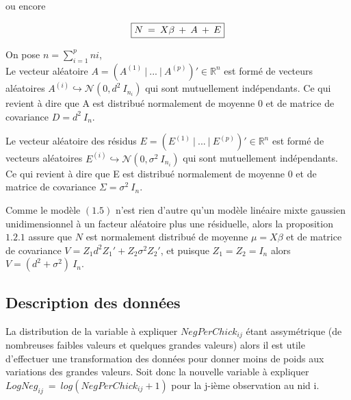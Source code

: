 \documentclass[12pt,fleqn]{book} %
\begin{document}
ou encore

\begin{equation}
\fbox{$
N\:=\:X\beta\:+\:A\:+\:E
$}
\end{equation}

\vspace{1em}

On pose $n=\sum_{i=1}^{p} ni$,\\ 

Le vecteur aléatoire $A=\left(A^{(1)}\:|\:...\:|\:A^{(p)}\right)'\in \mathbb{R}^{n}$ est formé de vecteurs aléatoires $A^{(i)}\hookrightarrow\mathcal{N}(0,d^2\:I_{n_i})$ qui sont mutuellement indépendants. Ce qui revient à dire que A est distribué normalement de moyenne $0$ et de matrice de covariance $D=d^2\:I_n$.  

\vspace{1em}

Le vecteur aléatoire des résidus $E=\left(E^{(1)}\:|\:...\:|\:E^{(p)}\right)'\in \mathbb{R}^{n}$ est formé de vecteurs aléatoires $E^{(i)}\hookrightarrow\mathcal{N}(0,\sigma^2\:I_{n_i})$ qui sont mutuellement indépendants. Ce qui revient à dire que E est distribué normalement de moyenne $0$ et de matrice de covariance $\Sigma=\sigma^2\:I_n$.  

\vspace{1em}

Comme le modèle $(1.5)$ n'est rien d'autre qu'un modèle linéaire mixte gaussien unidimensionnel à un facteur aléatoire plus une résiduelle, alors la proposition $1.2.1$ assure que $N$ est normalement distribué de moyenne $\mu=X\beta$ et de matrice de covariance $V= Z_1 d^2 Z_1' + Z_2 \sigma^2 Z_2'$, et puisque $Z_1=Z_2=I_n $ \: alors \: $ V=(d^2 + \sigma^2) \:I_n$.

\newpage 

\subsection{Description des données} 

\vspace{1em}

La distribution de la variable à expliquer $NegPerChick_{ij}$ étant assymétrique (de nombreuses faibles valeurs et quelques grandes valeurs) alors il est utile d'effectuer une transformation des données pour donner moins de poids aux variations des grandes valeurs. 
Soit donc la nouvelle variable à expliquer $LogNeg_{ij}\:=\:log(NegPerChick_{ij}+1)$ pour la j-ième observation au nid i.
\vspace{2em}
\end{document}
